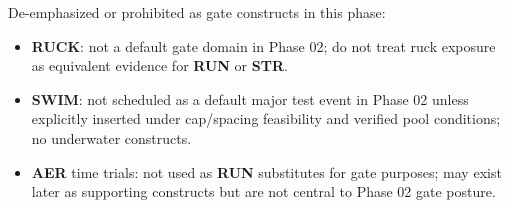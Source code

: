 \documentclass[10pt]{article}
\begin{document}
De-emphasized or prohibited as gate constructs in this phase:

\begin{itemize}
\item \textbf{RUCK}: not a default gate domain in Phase 02; do not treat ruck exposure as equivalent evidence for \textbf{RUN} or \textbf{STR}.
\item \textbf{SWIM}: not scheduled as a default major test event in Phase 02 unless explicitly inserted under cap/spacing feasibility and verified pool conditions; no underwater constructs.
\item \textbf{AER} time trials: not used as \textbf{RUN} substitutes for gate purposes; may exist later as supporting constructs but are not central to Phase 02 gate posture.
\end{itemize}
\end{document}
